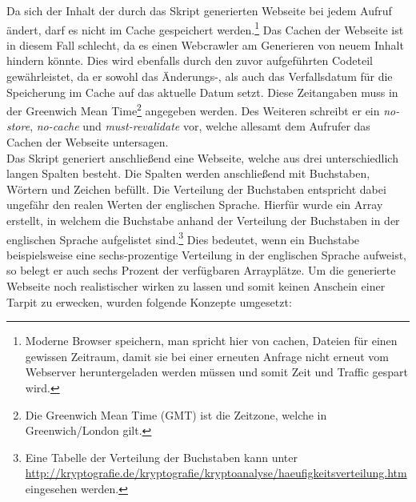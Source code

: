 Da sich der Inhalt der durch das Skript generierten Webseite bei jedem Aufruf ändert, darf es nicht im Cache gespeichert werden.\footnote{Moderne Browser speichern, man spricht hier von cachen, Dateien für einen gewissen Zeitraum, damit sie bei einer erneuten Anfrage nicht erneut vom Webserver heruntergeladen werden müssen und somit Zeit und Traffic gespart wird.} Das Cachen der Webseite ist in diesem Fall schlecht, da es einen Webcrawler am Generieren von neuem Inhalt hindern könnte. Dies wird ebenfalls durch den zuvor aufgeführten Codeteil gewährleistet, da er sowohl das Änderungs-, als auch das Verfallsdatum für die Speicherung im Cache auf das aktuelle Datum setzt. Diese Zeitangaben muss in der Greenwich Mean Time\footnote{Die Greenwich Mean Time (GMT) ist die Zeitzone, welche in Greenwich/London gilt.} angegeben werden\cite{http-header-time}. Des Weiteren schreibt er ein \emph{no-store}, \emph{no-cache} und \emph{must-revalidate} vor, welche allesamt dem Aufrufer das Cachen der Webseite untersagen.\\
Das Skript generiert anschließend eine Webseite, welche aus drei unterschiedlich langen Spalten besteht. Die Spalten werden anschließend mit Buchstaben, Wörtern und Zeichen befüllt. Die Verteilung der Buchstaben entspricht dabei ungefähr den realen Werten der englischen Sprache. Hierfür wurde ein Array erstellt, in welchem die Buchstabe anhand der Verteilung der Buchstaben in der englischen Sprache aufgelistet sind.\footnote{Eine Tabelle der Verteilung der Buchstaben kann unter \url{http://kryptografie.de/kryptografie/kryptoanalyse/haeufigkeitsverteilung.htm} eingesehen werden.}
 Dies bedeutet, wenn ein Buchstabe beispielsweise eine sechs-prozentige Verteilung in der englischen Sprache aufweist, so belegt er auch sechs Prozent der verfügbaren Arrayplätze. Um die generierte Webseite noch realistischer wirken zu lassen und somit keinen Anschein einer Tarpit zu erwecken, wurden folgende Konzepte umgesetzt:
